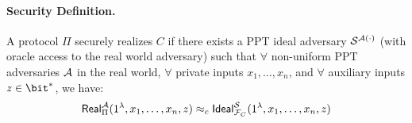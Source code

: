 \paragraph{Security Definition.} 
A protocol $\Pi$ securely realizes $C$ if there exists a PPT ideal adversary $\mathcal{S}^{\mathcal{A}(\cdot)}$ (with oracle access to the real world adversary) such that $\forall$ non-uniform PPT adversaries $\mathcal{A}$ in the real world, $\forall$ private inputs $x_1, \ldots, x_n$, and $\forall$ auxiliary inputs $z \in \bit^{\ast}$, we have:
\[ \mathsf{Real}^{\mathcal{A}}_{\Pi}(1^\lambda, x_1, \ldots, x_n, z) \approx_{c} \mathsf{Ideal}^{\mathcal{S}}_{\mathcal{F}_C}(1^\lambda, x_1, \ldots, x_n, z) \]






%

